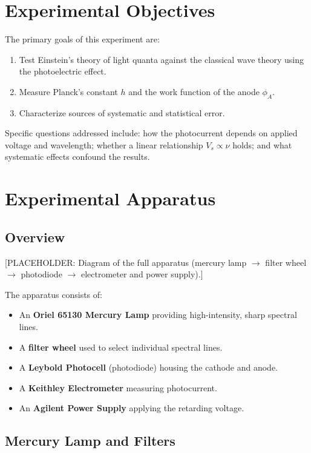\documentclass[12pt]{article}
\begin{document}
\section{Experimental Objectives}

The primary goals of this experiment are:
\begin{enumerate}
    \item Test Einstein's theory of light quanta against the classical wave theory using the photoelectric effect.
    \item Measure Planck's constant $h$ and the work function of the anode $\phi_A$.
    \item Characterize sources of systematic and statistical error.
\end{enumerate}
Specific questions addressed include: how the photocurrent depends on applied voltage and wavelength; whether a linear relationship $V_s \propto \nu$ holds; and what systematic effects confound the results.

\section{Experimental Apparatus}

\subsection{Overview}

[PLACEHOLDER: Diagram of the full apparatus (mercury lamp $\to$ filter wheel $\to$ photodiode $\to$ electrometer and power supply).]

The apparatus consists of:
\begin{itemize}
    \item An \textbf{Oriel 65130 Mercury Lamp} providing high-intensity, sharp spectral lines.
    \item A \textbf{filter wheel} used to select individual spectral lines.
    \item A \textbf{Leybold Photocell} (photodiode) housing the cathode and anode.
    \item A \textbf{Keithley Electrometer} measuring photocurrent.
    \item An \textbf{Agilent Power Supply} applying the retarding voltage.
\end{itemize}

\subsection{Mercury Lamp and Filters}
\end{document}
